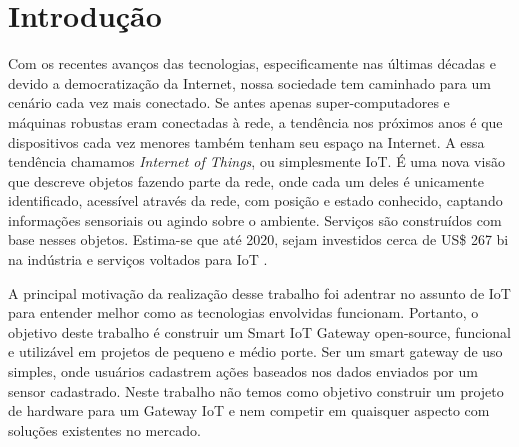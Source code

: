 \section*{Introdução}
\label{sec:intro}

Com os recentes avanços das tecnologias, especificamente nas últimas décadas e devido a democratização da Internet, nossa sociedade tem caminhado para um cenário cada vez mais conectado. Se antes apenas super-computadores e máquinas robustas eram conectadas à rede, a tendência nos próximos anos é que dispositivos cada vez menores também tenham seu espaço na Internet.
A essa tendência chamamos \textit{Internet of Things}, ou simplesmente IoT. É uma nova visão que descreve objetos fazendo parte da rede, onde cada um deles é unicamente identificado, acessível através da rede, com posição e estado conhecido, captando informações sensoriais ou agindo sobre o ambiente. Serviços são construídos com base nesses objetos. Estima-se que até 2020, sejam investidos cerca de US\$ 267 bi na indústria e serviços voltados para IoT \cite{BCGPerspectives,Forbes}.

A principal motivação da realização desse trabalho foi adentrar no assunto de IoT para entender melhor como as tecnologias envolvidas funcionam. Portanto, o objetivo deste trabalho é construir um Smart IoT Gateway open-source, funcional e utilizável em projetos de pequeno e médio porte. Ser um smart gateway de uso simples, onde usuários cadastrem ações baseados nos dados enviados por um sensor cadastrado. Neste trabalho não temos como objetivo construir um projeto de hardware para um Gateway IoT e nem competir em quaisquer aspecto com soluções existentes no mercado.
